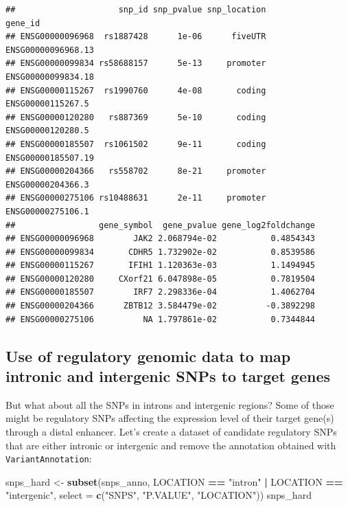 \documentclass[9pt,a4paper,]{extarticle}
\newenvironment{Shaded}{\begin{snugshade}}{\end{snugshade}}
\newcommand{\KeywordTok}[1]{\textcolor[rgb]{0.13,0.29,0.53}{\textbf{#1}}}
\newcommand{\DataTypeTok}[1]{\textcolor[rgb]{0.13,0.29,0.53}{#1}}
\newcommand{\StringTok}[1]{\textcolor[rgb]{0.31,0.60,0.02}{#1}}
\newcommand{\OperatorTok}[1]{\textcolor[rgb]{0.81,0.36,0.00}{\textbf{#1}}}
\newcommand{\NormalTok}[1]{#1}
\begin{document}
\begin{verbatim}
##                     snp_id snp_pvalue snp_location            gene_id
## ENSG00000096968  rs1887428      1e-06      fiveUTR ENSG00000096968.13
## ENSG00000099834 rs58688157      5e-13     promoter ENSG00000099834.18
## ENSG00000115267  rs1990760      4e-08       coding  ENSG00000115267.5
## ENSG00000120280   rs887369      5e-10       coding  ENSG00000120280.5
## ENSG00000185507  rs1061502      9e-11       coding ENSG00000185507.19
## ENSG00000204366   rs558702      8e-21     promoter  ENSG00000204366.3
## ENSG00000275106 rs10488631      2e-11     promoter  ENSG00000275106.1
##                 gene_symbol  gene_pvalue gene_log2foldchange
## ENSG00000096968        JAK2 2.068794e-02           0.4854343
## ENSG00000099834       CDHR5 1.732902e-02           0.8539586
## ENSG00000115267       IFIH1 1.120363e-03           1.1494945
## ENSG00000120280     CXorf21 6.047898e-05           0.7819504
## ENSG00000185507        IRF7 2.298336e-04           1.4062704
## ENSG00000204366      ZBTB12 3.584479e-02          -0.3892298
## ENSG00000275106          NA 1.797861e-02           0.7344844
\end{verbatim}

\subsection{Use of regulatory genomic data to map intronic and intergenic SNPs to target genes}\label{use-of-regulatory-genomic-data-to-map-intronic-and-intergenic-snps-to-target-genes}

But what about all the SNPs in introns and intergenic regions?
Some of those might be regulatory SNPs affecting the expression level of their target gene(s) through a distal enhancer.
Let's create a dataset of candidate regulatory SNPs that are either intronic or intergenic and remove the annotation obtained with \texttt{VariantAnnotation}:

\begin{Shaded}
\begin{Highlighting}[]
\NormalTok{snps_hard <-}\StringTok{ }\KeywordTok{subset}\NormalTok{(snps_anno, LOCATION }\OperatorTok{==}\StringTok{ "intron"} \OperatorTok{|}\StringTok{ }\NormalTok{LOCATION }\OperatorTok{==}\StringTok{ "intergenic"}\NormalTok{, }\DataTypeTok{select =} \KeywordTok{c}\NormalTok{(}\StringTok{"SNPS"}\NormalTok{, }\StringTok{"P.VALUE"}\NormalTok{, }\StringTok{"LOCATION"}\NormalTok{))}
\NormalTok{snps_hard}
\end{Highlighting}
\end{Shaded}
\end{document}
